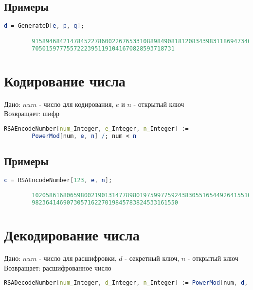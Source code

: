     	\subsection{Примеры}

    	\begin{lstlisting}[language=Mathematica,caption={
      		Пример	
    	}]
		d = GenerateD[e, p, q];

		915894684214784522786002267653310889849081812083439831186947346958122837148235\
		70501597775572223951191041670828593718731
    	\end{lstlisting}

	\section{Кодирование числа}
		Дано: $num$ - число для кодирования, $e$ и $n$ - открытый ключ \\
		Возвращает: шифр

		\begin{lstlisting}[language=Mathematica,caption={
      		Кодирование заданного числа	
    	}]
    	RSAEncodeNumber[num_Integer, e_Integer, n_Integer] := 
    	PowerMod[num, e, n] /; num < n
    	\end{lstlisting}

    	\subsection{Примеры}

    	\begin{lstlisting}[language=Mathematica,caption={
      		Пример	
    	}]
		c = RSAEncodeNumber[123, e, n];

		102058616806598002190131477898019759977592438305516544926415510748598280467606\
		982364146907305716227019845783824533161550
    	\end{lstlisting}

	\section{Декодирование числа}
		Дано: $num$ - число для расшифровки, $d$ - секретный ключ, $n$ - открытый ключ \\
		Возвращает: расшифрованное число

		\begin{lstlisting}[language=Mathematica,caption={
      		Декодирование числа	
    	}]
		RSADecodeNumber[num_Integer, d_Integer, n_Integer] := PowerMod[num, d, n]
    	\end{lstlisting}

